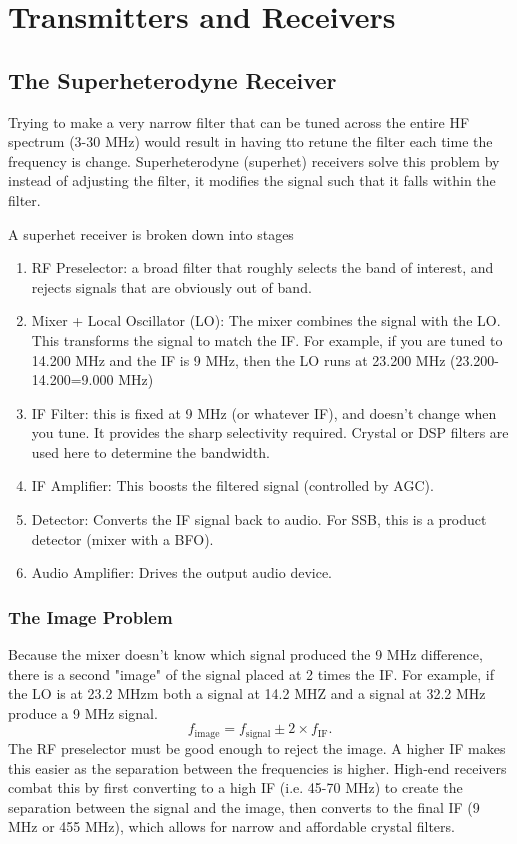 \documentclass{article}
\begin{document}
\section{Transmitters and Receivers}
\subsection{The Superheterodyne Receiver}
Trying to make a very narrow filter that can be tuned across the entire HF spectrum (3-30 MHz) would result in having tto retune the filter each time the frequency is change. Superheterodyne (superhet) receivers solve this problem by instead of adjusting the filter, it modifies the signal such that it falls within the filter.

A superhet receiver is broken down into stages
\begin{enumerate}
    \item RF Preselector: a broad filter that roughly selects the band of interest, and rejects signals that are obviously out of band.
    \item Mixer + Local Oscillator (LO): The mixer combines the signal with the LO. This transforms the signal to match the IF. For example, if you are tuned to 14.200 MHz and the IF is 9 MHz, then the LO runs at 23.200 MHz (23.200-14.200=9.000 MHz)
    \item IF Filter: this is fixed at 9 MHz (or whatever IF), and doesn't change when you tune. It provides the sharp selectivity required. Crystal or DSP filters are used here to determine the bandwidth.
    \item IF Amplifier: This boosts the filtered signal (controlled by AGC).
    \item Detector: Converts the IF signal back to audio. For SSB, this is a product detector (mixer with a BFO).
    \item Audio Amplifier: Drives the output audio device.
\end{enumerate}

\subsubsection{The Image Problem}
Because the mixer doesn't know which signal produced the 9 MHz difference, there is a second "image" of the signal placed at 2 times the IF. For example, if the LO is at 23.2 MHzm both a signal at 14.2 MHZ and a signal at 32.2 MHz produce a 9 MHz signal.
\[
    f_{\text{image}}=f_{\text{signal}}\pm2\times f_{\text{IF}}.
\]
The RF preselector must be good enough to reject the image. A higher IF makes this easier as the separation between the frequencies is higher. High-end receivers combat this by first converting to a high IF (i.e. 45-70 MHz) to create the separation between the signal and the image, then converts to the final IF (9 MHz or 455 MHz), which allows for narrow and affordable crystal filters.
\end{document}
